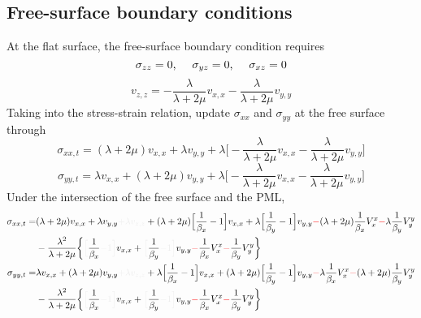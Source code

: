 \subsection{Free-surface boundary conditions}
At the flat surface, the free-surface boundary condition requires
\[ \sigma_{zz}=0 \text{,\hspace{5mm}} \sigma_{yz}=0 \text{,\hspace{5mm}} \sigma_{xz}=0 \]
\[ v_{z,z}=-\frac{\lambda}{\lambda+2\mu}v_{x,x}-\frac{\lambda}{\lambda+2\mu}v_{y,y} \]
Taking into the stress-strain relation, update $\sigma_{xx}$ and
$\sigma_{yy}$ at the free surface through
\[ \sigma_{xx,t}=(\lambda+2\mu)v_{x,x}+\lambda v_{y,y}+\lambda\Big[-\frac{\lambda}{\lambda+2\mu}v_{x,x}-\frac{\lambda}{\lambda+2\mu}v_{y,y}\Big] \]
\[ \sigma_{yy,t}=\lambda v_{x,x}+(\lambda+2\mu)v_{y,y}+\lambda\Big[-\frac{\lambda}{\lambda+2\mu}v_{x,x}-\frac{\lambda}{\lambda+2\mu}v_{y,y}\Big] \]
Under the intersection of the free surface and the PML,
\begin{align*}
  \sigma_{xx,t}= & (\lambda+2\mu)v_{x,x}+\lambda v_{y,y} \myde{+\lambda v_{z,z}} +(\lambda+2\mu)\Big[\frac{1}{\beta_x}-1\Big]v_{x,x}+\lambda\Big[\frac{1}{\beta_y}-1\Big]v_{y,y} \mynno{-} (\lambda+2\mu)\frac{1}{\beta_x}V_x^x \mynno{-} \lambda\frac{1}{\beta_y}V_y^y \\
    & -\frac{\lambda^2}{\lambda+2\mu}\bigg\{ \myde{\Big[} \frac{1}{\beta_x} \myde{-1\Big]} v_{x,x}+ \myde{\Big[} \frac{1}{\beta_y} \myde{-1\Big]} v_{y,y} \mynno{-} \frac{1}{\beta_x}V_x^x \mynno{-} \frac{1}{\beta_y}V_y^y\bigg\} \\
  \sigma_{yy,t}= & \lambda v_{x,x}+(\lambda+2\mu)v_{y,y} \myde{+\lambda v_{z,z}} +\lambda\Big[\frac{1}{\beta_x}-1\Big]v_{x,x}+(\lambda+2\mu)\Big[\frac{1}{\beta_y}-1\Big]v_{y,y} \mynno{-} \lambda\frac{1}{\beta_x}V_x^x \mynno{-} (\lambda+2\mu)\frac{1}{\beta_y}V_y^y \\
    & -\frac{\lambda^2}{\lambda+2\mu}\bigg\{ \myde{\Big[} \frac{1}{\beta_x} \myde{-1\Big]} v_{x,x}+ \myde{\Big[} \frac{1}{\beta_y} \myde{-1\Big]} v_{y,y} \mynno{-} \frac{1}{\beta_x}V_x^x \mynno{-} \frac{1}{\beta_y}V_y^y\bigg\}
\end{align*}

